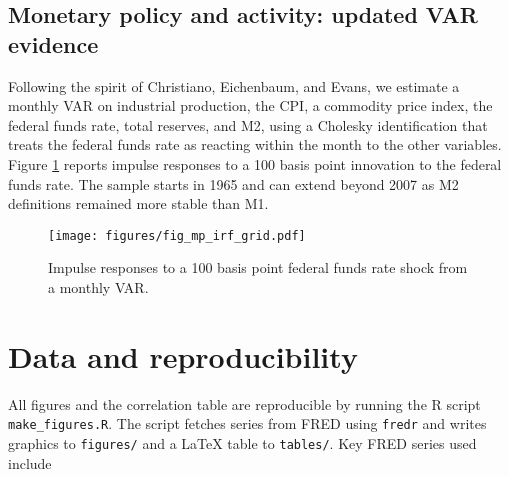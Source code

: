 \documentclass[11pt]{article}
\begin{document}
\subsection{Monetary policy and activity: updated VAR evidence}

Following the spirit of Christiano, Eichenbaum, and Evans, we estimate a monthly VAR on industrial production, the CPI, a commodity price index, the federal funds rate, total reserves, and M2, using a Cholesky identification that treats the federal funds rate as reacting within the month to the other variables. Figure \ref{fig:mp-irf} reports impulse responses to a 100 basis point innovation to the federal funds rate. The sample starts in 1965 and can extend beyond 2007 as M2 definitions remained more stable than M1.

\begin{figure}[h]
\centering
\texttt{[image: figures/fig\_mp\_irf\_grid.pdf]}
\caption{Impulse responses to a 100 basis point federal funds rate shock from a monthly VAR.}
\label{fig:mp-irf}
\end{figure}

\section{Data and reproducibility} \label{sec:data}

All figures and the correlation table are reproducible by running the R script \texttt{make\_figures.R}. The script fetches series from FRED using \texttt{fredr} and writes graphics to \texttt{figures/} and a LaTeX table to \texttt{tables/}. Key FRED series used include
\end{document}
